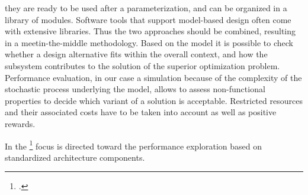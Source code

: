     they are ready to be used after a parameterization, and can be
    organized in a library of modules. Software tools that support
    model-based design often come with extensive libraries. Thus
    the two approaches should be combined, resulting in a meetin-the-middle methodology.
    Based on the model it is possible to check whether a design
    alternative fits within the overall context, and how the subsystem contributes to the solution of the superior optimization
    problem. Performance evaluation, in our case a simulation
    because of the complexity of the stochastic process underlying
    the model, allows to assess non-functional properties to decide
    which variant of a solution is acceptable. Restricted resources
    and their associated costs have to be taken into account as
    well as positive rewards.


    In \cite{Gustafsson2016} the \footcite{Gustafsson2016}  focus \cite{Gustafsson2016} is directed toward
    the performance exploration based on standardized architecture
    components.



